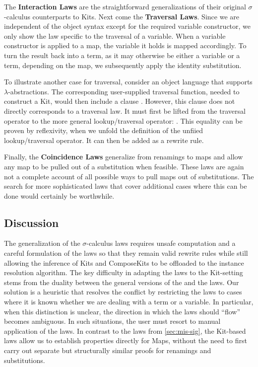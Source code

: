 \documentclass[screen,nonacm]{acmart}
\begin{document}
The \textbf{Interaction Laws} are the straightforward generalizations of their
original $\sigma$-calculus counterparts to Kits. Next come the
\textbf{Traversal Laws}. Since we are independent of the object syntax except
for the required variable constructor, we only show the law specific to the
traversal of a variable. When a variable constructor is applied to a map, the
variable it holds is mapped accordingly. To turn the result back into a term,
as it may otherwise be either a variable or a term, depending on the map, we
subsequently apply the identity substitution.

To illustrate another case for traversal, consider an object language that
supports $\lambda$-abstractions. The corresponding user-supplied traversal
function, needed to construct a Kit, would then include a clause \FSLambdaExT.
However, this clause does not directly corresponds to a traversal law. It must
first be lifted from the traversal operator to the more general
lookup/traversal operator: \FSLambdaExL. This equality can be proven by
reflexivity, when we unfold the definition of the unfiied lookup/traversal
operator. It can then be added as a rewrite rule.

Finally, the \textbf{Coincidence Laws} generalize from renamings to maps and
allow any map to be pulled out of a substitution when feasible. These laws are
again not a complete account of all possible ways to pull maps out of
substitutions. The search for more sophisticated laws that cover additional
cases where this can be done would certainly be worthwhile.

\subsection{Discussion}
The generalization of the $\sigma$-calculus laws requires unsafe computation
and a careful formulation of the laws so that they remain valid rewrite rules
while still allowing the inference of Kits and ComposeKits to be offloaded to
the instance resolution algorithm. The key difficulty in adapting the laws to
the Kit-setting stems from the duality between the general versions of the
 and the  laws. Our solution is
a heuristic that resolves the conflict by restricting the laws to cases where
it is known whether we are dealing with a term or a variable. In particular,
when this distinction is unclear, the direction in which the laws should “flow”
becomes ambiguous. In such situations, the user must resort to manual
application of the laws. In contrast to the laws from \cref{sec:mis-sig}, the
Kit-based laws allow us to establish properties directly for Maps, without the
need to first carry out separate but structurally similar proofs for renamings
and substitutions.
\end{document}
